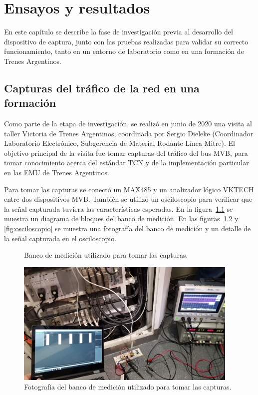 \chapter{Ensayos y resultados}

\label{cap:EnsayosResultados}

En este capítulo se describe la fase de investigación previa al desarrollo del dispositivo de captura, junto con las pruebas realizadas para validar su correcto funcionamiento, tanto en un entorno de laboratorio como en una formación de Trenes Argentinos.

\section{Capturas del tráfico de la red en una formación}
\label{sec:capturas}

Como parte de la etapa de investigación, se realizó en junio de 2020 una visita al taller Victoria de Trenes Argentinos, coordinada por Sergio Dieleke (Coordinador Laboratorio Electrónico, Subgerencia de Material Rodante Línea Mitre). El objetivo principal de la visita fue tomar capturas del tráfico del bus MVB, para tomar conocimiento acerca del estándar TCN y de la implementación particular en las EMU de Trenes Argentinos.

Para tomar las capturas se conectó un MAX485 y un analizador lógico VKTECH entre dos dispositivos MVB.
También se utilizó un osciloscopio para verificar que la señal capturada tuviera las características esperadas.
En la figura~\ref{fig:banco-capturas} se muestra un diagrama de bloques del banco de medición.
En las figuras~\ref{fig:foto-banco-capturas} y \ref{fig:osciloscopio} se muestra una fotografía del banco de medición y un detalle de la señal capturada en el osciloscopio.

\begin{figure}[htbp]
	\centering
    {
        \fontsize{9pt}{9pt}\selectfont
        
    }
	\caption{Banco de medición utilizado para tomar las capturas.}
    \label{fig:banco-capturas}
\end{figure}

\begin{figure}[htbp]
	\centering
	\includegraphics[width=0.95\textwidth]{./Figures/foto-capturas.jpg}
	\caption{Fotografía del banco de medición utilizado para tomar las capturas.}
    \label{fig:foto-banco-capturas}
\end{figure}

